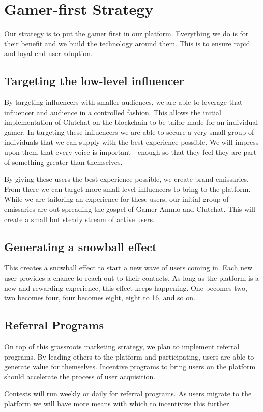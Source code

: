 \documentclass[11pt]{report}
\begin{document}
\section{Gamer-first Strategy}
Our strategy is to put the gamer first in our platform. Everything we do is for their benefit and we build the technology around them. This is to ensure rapid and loyal end-user adoption.
\subsection{Targeting the low-level influencer}
By targeting influencers with smaller audiences, we are able to leverage that influencer and audience in a controlled fashion. This allows the initial implementation of Clutchat on the blockchain to be tailor-made for an individual gamer. In targeting these influencers we are able to secure a very small group of individuals that we can supply with the best experience possible. We will impress upon them that every voice is important---enough so that they feel they are part of something greater than themselves.

By giving these users the best experience possible, we create brand emissaries. From there we can target more small-level influencers to bring to the platform. While we are tailoring an experience for these users, our initial group of emissaries are out spreading the gospel of Gamer Ammo and Clutchat. This will create a small but steady stream of active users.
\subsection{Generating a snowball effect}
This creates a snowball effect to start a new wave of users coming in. Each new user provides a chance to reach out to their contacts. As long as the platform is a new and rewarding experience, this effect keeps happening. One becomes two, two becomes four, four becomes eight, eight to 16, and so on.
\subsection{Referral Programs}
On top of this grassroots marketing strategy, we plan to implement referral programs. By leading others to the platform and participating, users are able to generate value for themselves. Incentive programs to bring users on the platform should accelerate the process of user acquisition.

Contests will run weekly or daily for referral programs. As users migrate to the platform we will have more means with which to incentivize this further.
\end{document}
